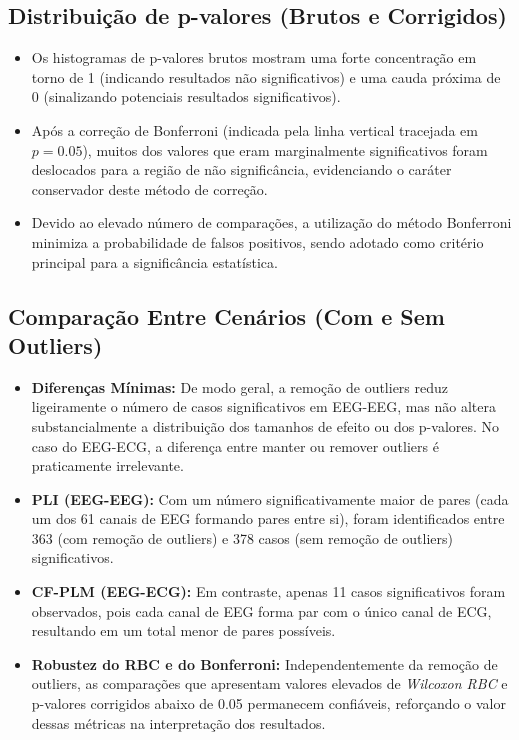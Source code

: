\subsection{Distribuição de p-valores (Brutos e Corrigidos)}

\begin{itemize}
    \item Os histogramas de p-valores brutos mostram uma forte concentração em torno de 1 (indicando resultados não significativos) e uma cauda próxima de 0 (sinalizando potenciais resultados significativos).
    \item Após a correção de Bonferroni (indicada pela linha vertical tracejada em \(p=0.05\)), muitos dos valores que eram marginalmente significativos foram deslocados para a região de não significância, evidenciando o caráter conservador deste método de correção.
    \item Devido ao elevado número de comparações, a utilização do método Bonferroni minimiza a probabilidade de falsos positivos, sendo adotado como critério principal para a significância estatística.
\end{itemize}


\subsection{Comparação Entre Cenários (Com e Sem Outliers)}
\begin{itemize}
    \item \textbf{Diferenças Mínimas:} De modo geral, a remoção de outliers reduz ligeiramente o número de casos significativos em EEG-EEG, mas não altera substancialmente a distribuição dos tamanhos de efeito ou dos p-valores. No caso do EEG-ECG, a diferença entre manter ou remover outliers é praticamente irrelevante.
    \item \textbf{PLI (EEG-EEG):} Com um número significativamente maior de pares (cada um dos 61 canais de EEG formando pares entre si), foram identificados entre 363 (com remoção de outliers) e 378 casos (sem remoção de outliers) significativos.
    \item \textbf{CF-PLM (EEG-ECG):} Em contraste, apenas 11 casos significativos foram observados, pois cada canal de EEG forma par com o único canal de ECG, resultando em um total menor de pares possíveis.
    \item \textbf{Robustez do RBC e do Bonferroni:} Independentemente da remoção de outliers, as comparações que apresentam valores elevados de \emph{Wilcoxon RBC} e p-valores corrigidos abaixo de 0.05 permanecem confiáveis, reforçando o valor dessas métricas na interpretação dos resultados.
\end{itemize}

